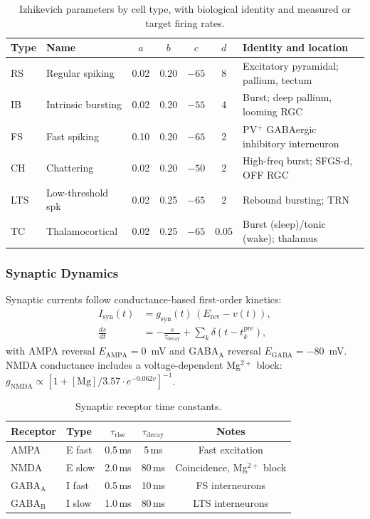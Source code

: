 \documentclass[11pt,a4paper]{article}
\begin{document}
\begin{table}[H]
\centering
\caption{Izhikevich parameters by cell type, with biological identity
  and measured or target firing rates.}
\label{tab:izhi_params}
\begin{tabular}{llccccp{4.8cm}}
\toprule
Type & Name & $a$ & $b$ & $c$ & $d$ & Identity and location \\
\midrule
RS  & Regular spiking    & 0.02 & 0.20 & $-65$ &  8 & Excitatory pyramidal; pallium, tectum \\
IB  & Intrinsic bursting & 0.02 & 0.20 & $-55$ &  4 & Burst; deep pallium, looming RGC \\
FS  & Fast spiking       & 0.10 & 0.20 & $-65$ &  2 & PV$^+$ GABAergic inhibitory interneuron \\
CH  & Chattering         & 0.02 & 0.20 & $-50$ &  2 & High-freq burst; SFGS-d, OFF RGC \\
LTS & Low-threshold spk  & 0.02 & 0.25 & $-65$ &  2 & Rebound bursting; TRN \\
TC  & Thalamocortical    & 0.02 & 0.25 & $-65$ & 0.05 & Burst (sleep)/tonic (wake); thalamus \\
\bottomrule
\end{tabular}
\end{table}

\subsubsection{Synaptic Dynamics}

Synaptic currents follow conductance-based first-order kinetics:
\begin{equation}\label{eq:synapse}
\begin{aligned}
  I_\mathrm{syn}(t) &= g_\mathrm{syn}(t)\,(E_\mathrm{rev} - v(t)), \\
  \frac{ds}{dt}   &= -\frac{s}{\tau_\mathrm{decay}}
    + \sum_{k} \delta(t - t_k^\mathrm{pre}),
\end{aligned}
\end{equation}
with AMPA reversal $E_\mathrm{AMPA} = 0$~mV and
GABA$_\mathrm{A}$ reversal $E_\mathrm{GABA} = -80$~mV.
NMDA conductance includes a voltage-dependent Mg$^{2+}$ block:
$g_\mathrm{NMDA} \propto [1 + [\mathrm{Mg}]/3.57 \cdot e^{-0.062v}]^{-1}$.

\begin{table}[H]
\centering
\caption{Synaptic receptor time constants.}
\label{tab:syn_tau}
\begin{tabular}{llccc}
\toprule
Receptor & Type & $\tau_\mathrm{rise}$ & $\tau_\mathrm{decay}$ & Notes \\
\midrule
AMPA        & E fast     & 0.5\,ms &  5\,ms & Fast excitation \\
NMDA        & E slow     & 2.0\,ms & 80\,ms & Coincidence, Mg$^{2+}$ block \\
GABA$_\mathrm{A}$ & I fast & 0.5\,ms & 10\,ms & FS interneurons \\
GABA$_\mathrm{B}$ & I slow & 1.0\,ms & 80\,ms & LTS interneurons \\
\bottomrule
\end{tabular}
\end{table}
\end{document}
